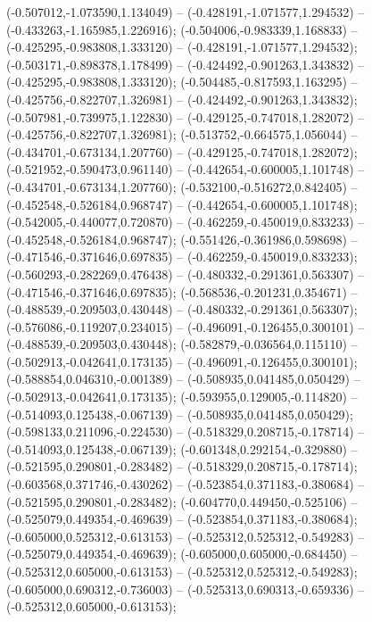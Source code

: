  (-0.507012,-1.073590,1.134049) -- (-0.428191,-1.071577,1.294532) -- (-0.433263,-1.165985,1.226916);
 (-0.504006,-0.983339,1.168833) -- (-0.425295,-0.983808,1.333120) -- (-0.428191,-1.071577,1.294532);
 (-0.503171,-0.898378,1.178499) -- (-0.424492,-0.901263,1.343832) -- (-0.425295,-0.983808,1.333120);
 (-0.504485,-0.817593,1.163295) -- (-0.425756,-0.822707,1.326981) -- (-0.424492,-0.901263,1.343832);
 (-0.507981,-0.739975,1.122830) -- (-0.429125,-0.747018,1.282072) -- (-0.425756,-0.822707,1.326981);
 (-0.513752,-0.664575,1.056044) -- (-0.434701,-0.673134,1.207760) -- (-0.429125,-0.747018,1.282072);
 (-0.521952,-0.590473,0.961140) -- (-0.442654,-0.600005,1.101748) -- (-0.434701,-0.673134,1.207760);
 (-0.532100,-0.516272,0.842405) -- (-0.452548,-0.526184,0.968747) -- (-0.442654,-0.600005,1.101748);
 (-0.542005,-0.440077,0.720870) -- (-0.462259,-0.450019,0.833233) -- (-0.452548,-0.526184,0.968747);
 (-0.551426,-0.361986,0.598698) -- (-0.471546,-0.371646,0.697835) -- (-0.462259,-0.450019,0.833233);
 (-0.560293,-0.282269,0.476438) -- (-0.480332,-0.291361,0.563307) -- (-0.471546,-0.371646,0.697835);
 (-0.568536,-0.201231,0.354671) -- (-0.488539,-0.209503,0.430448) -- (-0.480332,-0.291361,0.563307);
 (-0.576086,-0.119207,0.234015) -- (-0.496091,-0.126455,0.300101) -- (-0.488539,-0.209503,0.430448);
 (-0.582879,-0.036564,0.115110) -- (-0.502913,-0.042641,0.173135) -- (-0.496091,-0.126455,0.300101);
 (-0.588854,0.046310,-0.001389) -- (-0.508935,0.041485,0.050429) -- (-0.502913,-0.042641,0.173135);
 (-0.593955,0.129005,-0.114820) -- (-0.514093,0.125438,-0.067139) -- (-0.508935,0.041485,0.050429);
 (-0.598133,0.211096,-0.224530) -- (-0.518329,0.208715,-0.178714) -- (-0.514093,0.125438,-0.067139);
 (-0.601348,0.292154,-0.329880) -- (-0.521595,0.290801,-0.283482) -- (-0.518329,0.208715,-0.178714);
 (-0.603568,0.371746,-0.430262) -- (-0.523854,0.371183,-0.380684) -- (-0.521595,0.290801,-0.283482);
 (-0.604770,0.449450,-0.525106) -- (-0.525079,0.449354,-0.469639) -- (-0.523854,0.371183,-0.380684);
 (-0.605000,0.525312,-0.613153) -- (-0.525312,0.525312,-0.549283) -- (-0.525079,0.449354,-0.469639);
 (-0.605000,0.605000,-0.684450) -- (-0.525312,0.605000,-0.613153) -- (-0.525312,0.525312,-0.549283);
 (-0.605000,0.690312,-0.736003) -- (-0.525313,0.690313,-0.659336) -- (-0.525312,0.605000,-0.613153);

